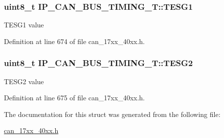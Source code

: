 \subsubsection[{\texorpdfstring{T\+E\+S\+G1}{TESG1}}]{\setlength{\rightskip}{0pt plus 5cm}uint8\+\_\+t I\+P\+\_\+\+C\+A\+N\+\_\+\+B\+U\+S\+\_\+\+T\+I\+M\+I\+N\+G\+\_\+\+T\+::\+T\+E\+S\+G1}\hypertarget{structIP__CAN__BUS__TIMING__T_ad1295003e524b683f247ea0dd4372380}{}\label{structIP__CAN__BUS__TIMING__T_ad1295003e524b683f247ea0dd4372380}
T\+E\+S\+G1 value 

Definition at line 674 of file can\+\_\+17xx\+\_\+40xx.\+h.

\subsubsection[{\texorpdfstring{T\+E\+S\+G2}{TESG2}}]{\setlength{\rightskip}{0pt plus 5cm}uint8\+\_\+t I\+P\+\_\+\+C\+A\+N\+\_\+\+B\+U\+S\+\_\+\+T\+I\+M\+I\+N\+G\+\_\+\+T\+::\+T\+E\+S\+G2}\hypertarget{structIP__CAN__BUS__TIMING__T_a67805cda8a3bb4be441ac2ebd25ed3a7}{}\label{structIP__CAN__BUS__TIMING__T_a67805cda8a3bb4be441ac2ebd25ed3a7}
T\+E\+S\+G2 value 

Definition at line 675 of file can\+\_\+17xx\+\_\+40xx.\+h.



The documentation for this struct was generated from the following file\+:\begin{DoxyCompactItemize}
\item 
\hyperlink{can__17xx__40xx_8h}{can\+\_\+17xx\+\_\+40xx.\+h}\end{DoxyCompactItemize}
